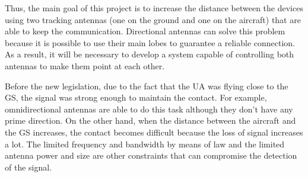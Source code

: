 Thus, the main goal of this project is to increase the distance between the devices using two tracking antennas (one on the ground and one on the aircraft) that are able to keep the communication. Directional antennas can solve this problem  because it is possible to use their main lobes to guarantee a reliable connection. As a result, it will be necessary to develop a system capable of controlling both antennas to make them point at each other.



Before the new legislation, due to the fact that the UA was flying close to the GS, the signal was strong enough to maintain the contact. For example, omnidirectional antennas are able to do this task although they don't have any prime direction. On the other hand, when the distance between the aircraft and the GS increases, the contact becomes difficult because the loss of signal increases a lot. The limited frequency and bandwidth by means of law and the limited antenna power and size are other constraints that can compromise the detection of the signal. 


